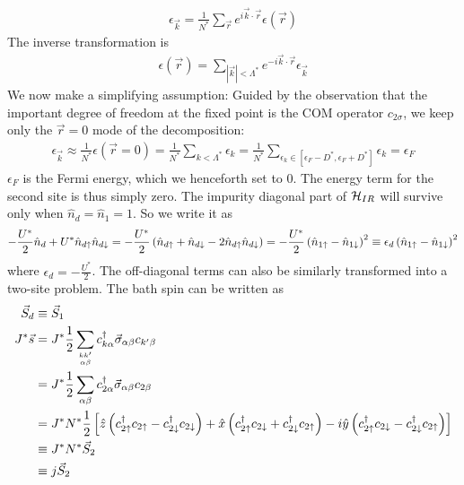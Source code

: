 \documentclass[12pt,twoside]{report}
\numberwithin{equation}{section}
\begin{document}
\begin{equation}\begin{aligned}
	\epsilon_{\vec{k}} = \frac{1}{N^*}\sum_{\vec r}e^{i \vec{k}\cdot\vec{r}}\epsilon(\vec r)
\end{aligned}\end{equation}
The inverse transformation is
\begin{equation}\begin{aligned}
	\epsilon(\vec r) = \sum_{|\vec k| < \Lambda^*}e^{-i \vec{k}\cdot\vec{r}}\epsilon_{\vec{k}}
\end{aligned}\end{equation}
We now make a simplifying assumption: Guided by the observation that the important degree of freedom at the fixed point is the COM operator \(c_{2\sigma}\), we keep only the \(\vec r=0\) mode of the decomposition:
\begin{equation}\begin{aligned}
	\epsilon_{\vec k} \approx \frac{1}{N^*}\epsilon(\vec r=0) = \frac{1}{N^*}\sum_{k<\Lambda^*}\epsilon_k = \frac{1}{N^*}\sum_{\epsilon_k \in [\epsilon_F - D^*, \epsilon_F + D^*]}\epsilon_k = \epsilon_F
\end{aligned}\end{equation}
\(\epsilon_F\) is the Fermi energy, which we henceforth set to 0. The energy term for the second site is thus simply zero. The impurity diagonal part of \(\mathcal{H}_{IR}\) will survive only when \(\hat n_d = \hat n_1 = 1\). So we write it as
\begin{equation}\begin{aligned}
	- \frac{U^*}{2}\hat n_d + U^* \hat n_{d\uparrow}\hat n_{d\downarrow} = - \frac{U^*}{2}\left(\hat n_{d\uparrow} + \hat n_{d \downarrow} - 2\hat n_{d\uparrow}\hat n_{d\downarrow}\right) = - \frac{U^*}{2} \left(\hat n_{1 \uparrow} - \hat n_{1 \downarrow}\right)^2 \equiv \epsilon_d \left(\hat n_{1 \uparrow} - \hat n_{1 \downarrow}\right)^2
\end{aligned}\end{equation}
where \(\epsilon_d = - \frac{U^*}{2}\). The off-diagonal terms can also be similarly transformed into a two-site problem. The bath spin can be written as
\begin{equation}\begin{aligned}
	\vec S_d &\equiv \vec S_1\\
	J^*\vec s &= J^* \frac{1}{2}\sum_{kk^\prime\atop{\alpha\beta}}c^\dagger_{k\alpha}\vec \sigma_{\alpha\beta}c_{k^\prime\beta} \\
	       &= J^*\frac{1}{2}\sum_{\alpha\beta}c^\dagger_{2\alpha}\vec \sigma_{\alpha\beta}c_{2\beta} \\
	       &= J^* N^* \frac{1}{2}\left[\hat z\left(c^\dagger_{2 \uparrow}c_{2 \uparrow} - c^\dagger_{2 \downarrow} c_{2 \downarrow} \right) + \hat x \left(c^\dagger_{2 \uparrow}c_{2 \downarrow} + c^\dagger_{2 \downarrow} c_{2 \uparrow} \right) -i \hat y \left( c^\dagger_{2 \uparrow}c_{2 \downarrow} - c^\dagger_{2 \downarrow} c_{2 \uparrow} \right)\right]\\
	       &\equiv J^*N^* \vec S_2\\
	       &\equiv j \vec S_2\\
\end{aligned}\end{equation}
\end{document}
